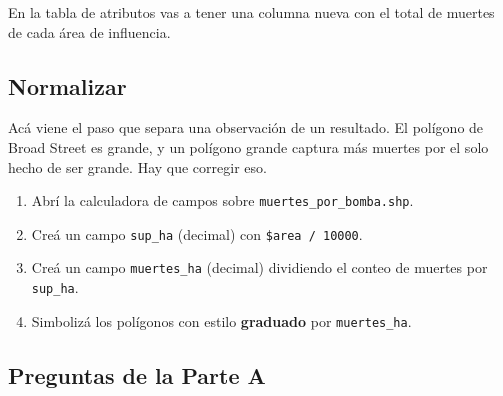 \documentclass{article}
\begin{document}
En la tabla de atributos vas a tener una columna nueva con el total de muertes de cada área de influencia.

\subsection{Normalizar}

Acá viene el paso que separa una observación de un resultado. El polígono de Broad Street es grande, y un polígono grande captura más muertes por el solo hecho de ser grande. Hay que corregir eso.

\begin{enumerate}
    \item Abrí la calculadora de campos sobre \texttt{muertes\_por\_bomba.shp}.
    \item Creá un campo \texttt{sup\_ha} (decimal) con \texttt{\$area / 10000}.
    \item Creá un campo \texttt{muertes\_ha} (decimal) dividiendo el conteo de muertes por \texttt{sup\_ha}.
    \item Simbolizá los polígonos con estilo \textbf{graduado} por \texttt{muertes\_ha}.
\end{enumerate}

\subsection{Preguntas de la Parte A}
\end{document}
